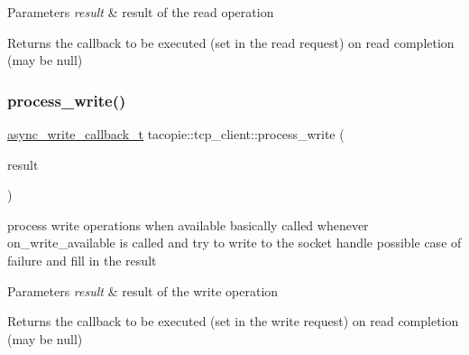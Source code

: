 \begin{DoxyParams}{Parameters}
{\em result} & result of the read operation \\
\hline
\end{DoxyParams}
\begin{DoxyReturn}{Returns}
the callback to be executed (set in the read request) on read completion (may be null) 
\end{DoxyReturn}
\mbox{\label{classtacopie_1_1tcp__client_afd5e43d5f44930894de10ce05268607f}} 
\subsubsection{\texorpdfstring{process\+\_\+write()}{process\_write()}}
{\footnotesize\ttfamily \hyperlink{classtacopie_1_1tcp__client_ad48b8c8dff8a77490eb2e3e802c82b97}{async\+\_\+write\+\_\+callback\+\_\+t} tacopie\+::tcp\+\_\+client\+::process\+\_\+write (\begin{DoxyParamCaption}\item[{\hyperlink{structtacopie_1_1tcp__client_1_1write__result}{write\+\_\+result} \&}]{result }\end{DoxyParamCaption})\hspace{0.3cm}{\ttfamily [private]}}

process write operations when available basically called whenever on\+\_\+write\+\_\+available is called and try to write to the socket handle possible case of failure and fill in the result


\begin{DoxyParams}{Parameters}
{\em result} & result of the write operation \\
\hline
\end{DoxyParams}
\begin{DoxyReturn}{Returns}
the callback to be executed (set in the write request) on read completion (may be null) 
\end{DoxyReturn}
\mbox{\label{classtacopie_1_1tcp__client_a8c290d681186edb0578051c04f3c0762}} 
